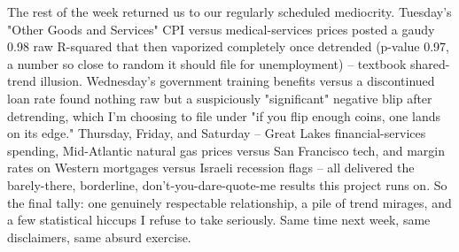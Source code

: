 The rest of the week returned us to our regularly scheduled mediocrity. Tuesday's "Other Goods and Services" CPI versus medical-services prices posted a gaudy 0.98 raw R-squared that then vaporized completely once detrended (p-value 0.97, a number so close to random it should file for unemployment) -- textbook shared-trend illusion. Wednesday's government training benefits versus a discontinued loan rate found nothing raw but a suspiciously "significant" negative blip after detrending, which I'm choosing to file under "if you flip enough coins, one lands on its edge." Thursday, Friday, and Saturday -- Great Lakes financial-services spending, Mid-Atlantic natural gas prices versus San Francisco tech, and margin rates on Western mortgages versus Israeli recession flags -- all delivered the barely-there, borderline, don't-you-dare-quote-me results this project runs on. So the final tally: one genuinely respectable relationship, a pile of trend mirages, and a few statistical hiccups I refuse to take seriously. Same time next week, same disclaimers, same absurd exercise.
